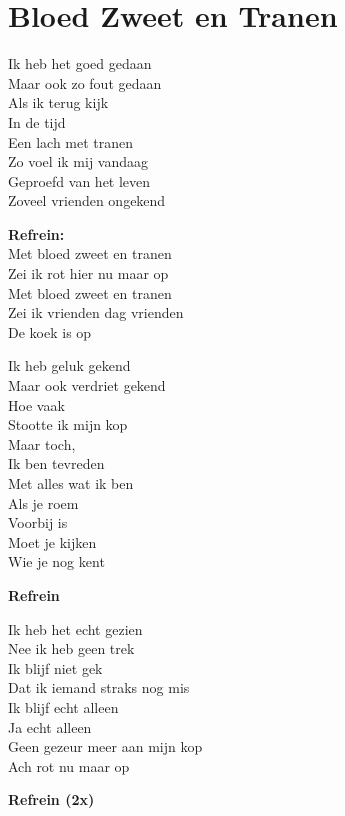 \section{Bloed Zweet en Tranen}
Ik heb het goed gedaan\\
Maar ook zo fout gedaan\\
Als ik terug kijk\\
In de tijd\\
Een lach met tranen\\
Zo voel ik mij vandaag\\
Geproefd van het leven\\
Zoveel vrienden ongekend

\textbf{Refrein:}\\
Met bloed zweet en tranen\\
Zei ik rot hier nu maar op\\
Met bloed zweet en tranen\\
Zei ik vrienden dag vrienden\\
De koek is op

Ik heb geluk gekend\\
Maar ook verdriet gekend\\
Hoe vaak\\
Stootte ik mijn kop\\
Maar toch,\\
Ik ben tevreden\\
Met alles wat ik ben\\
Als je roem\\
Voorbij is\\
Moet je kijken\\
Wie je nog kent

\textbf{Refrein}

Ik heb het echt gezien\\
Nee ik heb geen trek\\
Ik blijf niet gek\\
Dat ik iemand straks nog mis\\
Ik blijf echt alleen\\
Ja echt alleen\\
Geen gezeur meer aan mijn kop\\
Ach rot nu maar op

\textbf{Refrein (2x)}
